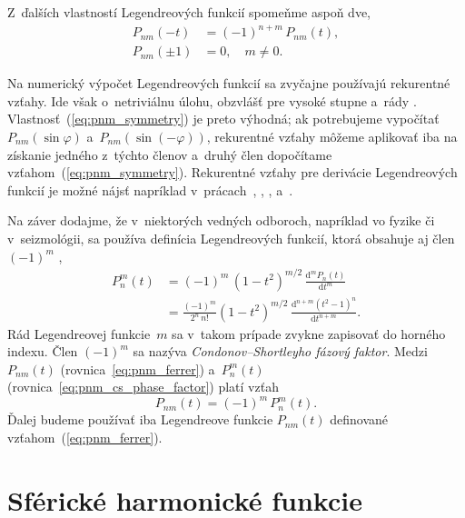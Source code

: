 \documentclass[a4paper, 12pt]{book}
\newcommand{\diff}{\mathrm d}
\begin{document}
Z~ďalších vlastností Legendreových funkcií spomeňme aspoň dve,
%
\begin{align}
\label{eq:pnm_symmetry}
P_{nm}(-t) &= (-1)^{n + m} \, P_{nm}(t){,}\\
%
P_{nm}(\pm1) &= 0{,} \quad m \neq 0{.}
\end{align}

Na numerický výpočet Legendreových funkcií sa zvyčajne používajú rekurentné 
vzťahy.  Ide však o~netriviálnu úlohu, obzvlášť pre vysoké stupne a~rády 
\parencite{Holmes2002a,Fukushima2012a,Ishioka2018}.  
Vlastnosť~(\ref{eq:pnm_symmetry}) je preto výhodná; ak potrebujeme vypočítať 
$P_{nm}(\sin\varphi)$ a~$P_{nm}(\sin(-\varphi))$, rekurentné vzťahy môžeme 
aplikovať iba na získanie jedného z~týchto členov a~druhý člen dopočítame 
vzťahom~(\ref{eq:pnm_symmetry}).  Rekurentné vzťahy pre derivácie Legendreových 
funkcií je možné nájsť napríklad v~prácach~\textcite{Tscherning1976b}, 
\textcite{Bosch2000}, \textcite{Holmes2002a}, \textcite{Freeden2009} 
a~\textcite{Fukushima2012b}.

Na záver dodajme, že v~niektorých vedných odboroch, napríklad vo fyzike či 
v~seizmológii, sa používa definícia Legendreových funkcií, ktorá obsahuje aj 
člen~$(-1)^m$ \parencite{Wieczorek2015,Olver2010},
%
\begin{equation}
\label{eq:pnm_cs_phase_factor}
\begin{split}
P_n^m(t) &= (-1)^m \, (1 - t^2)^{m \slash 2} \, \frac{\diff^m P_n(t)}{\diff 
t^m}\\
%
&= \frac{(-1)^m}{2^n \, n!} (1 - t^2)^{ m \slash 2} \, \frac{\diff^{n + m}
(t^2 - 1)^n}{\diff t^{n + m}}{.}
\end{split}
\end{equation}
%
Rád Legendreovej funkcie~$m$ sa v~takom prípade zvykne zapisovať do horného 
indexu.  Člen $(-1)^{m}$ sa nazýva \emph{Condonov--Shortleyho fázový faktor}.  
Medzi $P_{nm}(t)$ (rovnica~\ref{eq:pnm_ferrer}) a~$P_n^m(t)$ 
(rovnica~\ref{eq:pnm_cs_phase_factor}) platí vzťah
%
\begin{equation}
P_{nm}(t) = (-1)^m \, P_n^m(t){.}
\end{equation}
%
Ďalej budeme používať iba Legendreove funkcie $P_{nm}(t)$ definované 
vzťahom~(\ref{eq:pnm_ferrer}).




\section{Sférické harmonické funkcie}
\label{sec:spherical_harmonics}
\end{document}

